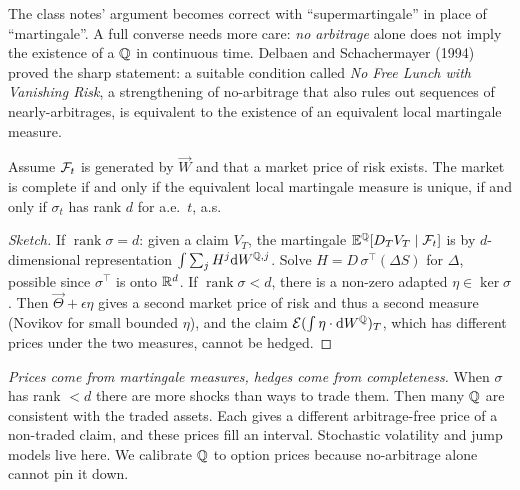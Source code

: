 The class notes' argument becomes correct with ``supermartingale'' in place of ``martingale''. A full converse needs more care: \emph{no arbitrage} alone does not imply the existence of a $\mathbb{Q}$ in continuous time. Delbaen and Schachermayer (1994) proved the sharp statement: a suitable condition called \emph{No Free Lunch with Vanishing Risk}, a strengthening of no-arbitrage that also rules out sequences of nearly-arbitrages, is equivalent to the existence of an equivalent local martingale measure.

\begin{theorem}\label{thm:ftap2}
Assume $\mathcal{F}_t$ is generated by $\vec W$ and that a market price of risk exists. The market is complete if and only if the equivalent local martingale measure is unique, if and only if $\sigma_t$ has rank $d$ for a.e.\ $t$, a.s.
\end{theorem}
\begin{proof}[Sketch]
If $\operatorname{rank}\sigma=d$: given a claim $V_T$, the martingale $\mathbb{E}^{\mathbb{Q}}[D_TV_T\mid\mathcal{F}_t]$ is by $d$-dimensional representation $\int\sum_jH^j\mathrm{d} W^{\mathbb{Q},j}$. Solve $H=D\,\sigma^\top(\Delta S)$ for $\Delta$, possible since $\sigma^\top$ is onto $\mathbb{R}^d$. If $\operatorname{rank}\sigma<d$, there is a non-zero adapted $\eta\in\ker\sigma$. Then $\vec\Theta+\epsilon\eta$ gives a second market price of risk and thus a second measure (Novikov for small bounded $\eta$), and the claim $\mathcal{E}(\int\eta\cdot\mathrm{d} W^{\mathbb{Q}})_T$, which has different prices under the two measures, cannot be hedged.
\end{proof}

\begin{intuition}
\emph{Prices come from martingale measures, hedges come from completeness.} When $\sigma$ has rank $<d$ there are more shocks than ways to trade them. Then many $\mathbb{Q}$ are consistent with the traded assets. Each gives a different arbitrage-free price of a non-traded claim, and these prices fill an interval. Stochastic volatility and jump models live here. We calibrate $\mathbb{Q}$ to option prices because no-arbitrage alone cannot pin it down.
\end{intuition}

